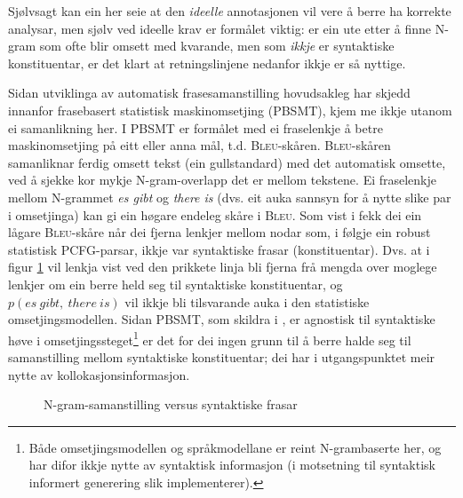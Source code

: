 \documentclass[11pt,a4paper,oneside,draft]{book}
\newcommand{\Bleu}{\textsc{Bleu}}
\begin{document}
Sjølvsagt kan ein her seie at den \emph{ideelle} annotasjonen vil vere å
berre ha korrekte analysar, men sjølv ved ideelle krav er formålet
viktig: er ein ute etter å finne N-gram som ofte blir omsett med
kvarande, men som \emph{ikkje} er syntaktiske konstituentar, er det klart
at retningslinjene nedanfor ikkje er så nyttige.

Sidan utviklinga av automatisk frasesamanstilling hovudsakleg har
skjedd innanfor frasebasert statistisk maskinomsetjing (PBSMT), kjem
me ikkje utanom ei samanlikning her. I PBSMT er formålet med ei
fraselenkje å betre maskinomsetjing på eitt eller anna mål,
t.d. \Bleu-skåren. \Bleu-skåren samanliknar ferdig omsett tekst (ein
gullstandard) med det automatisk omsette, ved å sjekke kor mykje
N-gram-overlapp det er mellom tekstene. Ei fraselenkje mellom
N-grammet \emph{es gibt} og \emph{there is} (dvs. eit auka sannsyn for å nytte
slike par i omsetjinga) kan gi ein høgare endeleg skåre i \Bleu. Som
vist i \citet{koehn2003spb} fekk dei ein lågare \Bleu-skåre når dei
  fjerna lenkjer mellom nodar som, i følgje ein robust
statistisk PCFG-parsar, ikkje var syntaktiske frasar
(konstituentar). Dvs. at i figur \ref{fig:ikkjenode} vil lenkja vist
ved den prikkete linja bli fjerna frå mengda over moglege lenkjer om
ein berre held seg til syntaktiske konstituentar, og
$p(es~gibt,~there~is)$ vil ikkje bli tilsvarande auka i den
statistiske omsetjingsmodellen. Sidan PBSMT, som skildra i
\citet{koehn2003spb}, er agnostisk til syntaktiske høve i
omsetjingssteget\footnote{Både omsetjingsmodellen og språkmodellane er reint
      N-grambaserte her, og har difor ikkje nytte av syntaktisk
      informasjon (i motsetning til syntaktisk informert generering
      slik \citet{riezler2006gmt} implementerer). } er det for dei ingen grunn til å berre halde
seg til samanstilling mellom syntaktiske konstituentar; dei har i
utgangspunktet meir nytte av kollokasjonsinformasjon.

\begin{figure}[htp]
   \centering
   \caption{N-gram-samanstilling versus syntaktiske frasar}
    \label{fig:ikkjenode}
  \end{figure}
\end{document}
